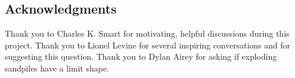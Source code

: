 \documentclass[aap]{imsart}
\begin{document}
\subsection*{Acknowledgments}
Thank you to Charles K. Smart for motivating, helpful discussions 
during this project. Thank you to Lionel Levine for several
inspiring conversations and for suggesting this question.  Thank you to Dylan Airey for asking if exploding sandpiles have a limit shape. 



 




\end{document}
